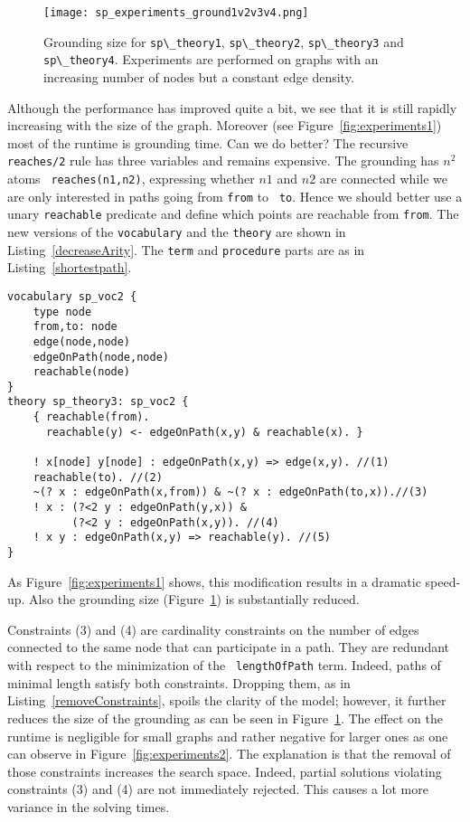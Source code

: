 \documentclass{tlp}
\renewcommand{\|}{\ensuremath{\,|\,}}
\newcommand{\listingref}[1]{Listing~\ref{#1}}
\renewcommand{\|}{\,|\,}
\newcommand{\idpcode}[1]{\lstinline{#1}}
\begin{document}
\begin{figure}[t]
  \centering
  \texttt{[image: sp\_experiments\_ground1v2v3v4.png]}
  \caption{Grounding size for \idpcode{sp\_theory1},
    \idpcode{sp\_theory2}, \idpcode{sp\_theory3} and
    \idpcode{sp\_theory4}. Experiments are performed on graphs with an
    increasing number of nodes but a constant edge density.}
  \label{fig:experimentsgrounding}
\end{figure}



Although the performance has improved quite a bit, we see that it is
still rapidly increasing with the size of the graph. Moreover (see
Figure~\ref{fig:experiments1}) most of the runtime is grounding
time. Can we do better? The recursive {\tt reaches/2} rule has three
variables and remains expensive. The grounding has $n^2$ atoms {\tt
  reaches(n1,n2)}, expressing whether $n1$ and $n2$ are connected
while we are only interested in paths going from {\tt from} to {\tt
  to}. Hence we should better use a unary {\tt reachable} predicate
and define which points are reachable from {\tt from}. The new
versions of the {\tt vocabulary} and the {\tt theory} are shown in
\listingref{decreaseArity}. The {\tt term} and {\tt procedure} parts
are as in \listingref{shortestpath}.


\begin{lstlisting}[caption={A unary {\tt reachable} relation instead
    of the binary {\tt reaches relation}.},label={decreaseArity}]
vocabulary sp_voc2 {
    type node
    from,to: node
    edge(node,node)
    edgeOnPath(node,node)
    reachable(node)
}
theory sp_theory3: sp_voc2 {
    { reachable(from).
      reachable(y) <- edgeOnPath(x,y) & reachable(x). }

    ! x[node] y[node] : edgeOnPath(x,y) => edge(x,y). //(1)
    reachable(to). //(2)
    ~(? x : edgeOnPath(x,from)) & ~(? x : edgeOnPath(to,x)).//(3)
    ! x : (?<2 y : edgeOnPath(y,x)) &
          (?<2 y : edgeOnPath(x,y)). //(4)
    ! x y : edgeOnPath(x,y) => reachable(y). //(5)
}
\end{lstlisting}

As Figure~\ref{fig:experiments1} shows, this modification results in a
dramatic speed-up. Also the grounding size
(Figure~\ref{fig:experimentsgrounding}) is substantially reduced.


Constraints (3) and (4) are cardinality constraints on the number of
edges connected to the same node that can participate in a path. They
are redundant with respect to the minimization of the {\tt
  lengthOfPath} term. Indeed, paths of minimal length satisfy both
constraints. Dropping them, as in \listingref{removeConstraints},
spoils the clarity of the model; however, it further reduces the size
of the grounding as can be seen in
Figure~\ref{fig:experimentsgrounding}. The effect on the runtime is
negligible for small graphs and rather negative for larger ones as one
can observe in Figure~\ref{fig:experiments2}. The explanation is that
the removal of those constraints increases the search space. Indeed, partial
solutions violating constraints (3) and (4) are not immediately
rejected. This causes a lot more variance in the solving times.
\end{document}
